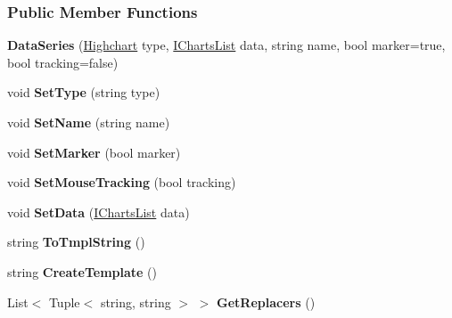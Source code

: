\subsubsection*{Public Member Functions}
\begin{DoxyCompactItemize}
\item 
\mbox{\label{classHighcharts_1_1DataSeries_a4dee11da81971b736dcdb922c49ee673}} 
{\bfseries Data\+Series} (\hyperlink{classHighcharts_1_1Highchart}{Highchart} type, \hyperlink{interfaceHighcharts_1_1IChartsList}{I\+Charts\+List} data, string name, bool marker=true, bool tracking=false)
\item 
\mbox{\label{classHighcharts_1_1DataSeries_ac2e5653e93416c7de4fe29251c4470cd}} 
void {\bfseries Set\+Type} (string type)
\item 
\mbox{\label{classHighcharts_1_1DataSeries_a82b23f1074f0c74e267aecd88a355a42}} 
void {\bfseries Set\+Name} (string name)
\item 
\mbox{\label{classHighcharts_1_1DataSeries_af44d67d2a2ce0f3ae4727b7cf501d245}} 
void {\bfseries Set\+Marker} (bool marker)
\item 
\mbox{\label{classHighcharts_1_1DataSeries_a9bcedcb140286dd1987ccb2e18f27a6b}} 
void {\bfseries Set\+Mouse\+Tracking} (bool tracking)
\item 
\mbox{\label{classHighcharts_1_1DataSeries_acd7d0fc170c47a8f8035ddd9eefca1df}} 
void {\bfseries Set\+Data} (\hyperlink{interfaceHighcharts_1_1IChartsList}{I\+Charts\+List} data)
\item 
\mbox{\label{classHighcharts_1_1DataSeries_aeef147d554ea7643c83394f29297359e}} 
string {\bfseries To\+Tmpl\+String} ()
\item 
\mbox{\label{classHighcharts_1_1DataSeries_a8de4430c7a4d26ca3ef2506c1ec4e9e9}} 
string {\bfseries Create\+Template} ()
\item 
\mbox{\label{classHighcharts_1_1DataSeries_a3d07ca3f01584223ab2ce140b8f14e5e}} 
List$<$ Tuple$<$ string, string $>$ $>$ {\bfseries Get\+Replacers} ()
\end{DoxyCompactItemize}
